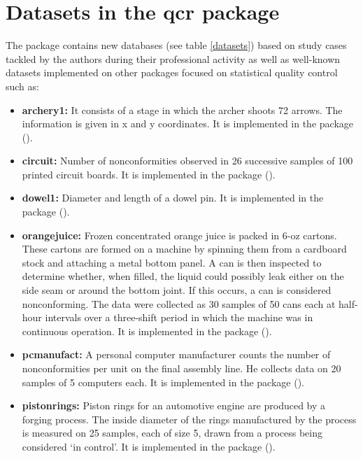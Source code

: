 \section{Datasets in the qcr package} \label{sec:datsets}

The  package contains new databases (see table \ref{datasets}) based on study cases tackled by the authors during their professional activity as well as well-known datasets implemented on other packages focused on statistical quality control such as: 
\begin{itemize}
\item \textbf{archery1: }It consists of a stage in which the archer shoots 72 arrows. The information is given in x and y coordinates. It is implemented in the  package (\citealt{santos2016package}).
\item \textbf{circuit: }Number of nonconformities observed in 26 successive samples of 100 printed circuit boards. It is implemented in the  package (\citealt{scrucca2004qcc}).
\item \textbf{dowel1: }Diameter and length of a dowel pin. It is implemented in the  package (\citealt{santos2016package}).
\item  \textbf{orangejuice: }Frozen concentrated orange juice is packed in 6-oz cartons.  These cartons are formed on a machine by spinning them from a cardboard stock and attaching a metal bottom panel. A can is then
inspected to determine whether, when filled, the liquid could possibly leak either on the side seam or
around the bottom joint. If this occurs, a can is considered nonconforming. The data were collected
as 30 samples of 50 cans each at half-hour intervals over a three-shift period in which the machine
was in continuous operation. It is implemented in the  package (\citealt{scrucca2004qcc}).
\item \textbf{pcmanufact: }A personal computer manufacturer counts the number of nonconformities per unit on the final assembly line. He collects data on 20 samples of 5 computers each. It is implemented in the  package (\citealt{scrucca2004qcc}).
\item \textbf{pistonrings: }Piston rings for an automotive engine are produced by a forging process. The inside diameter of the rings manufactured by the process is measured on 25 samples, each of size 5, drawn from a process being considered `in control'. It is implemented in the  package (\citealt{scrucca2004qcc}).
\end{itemize}


